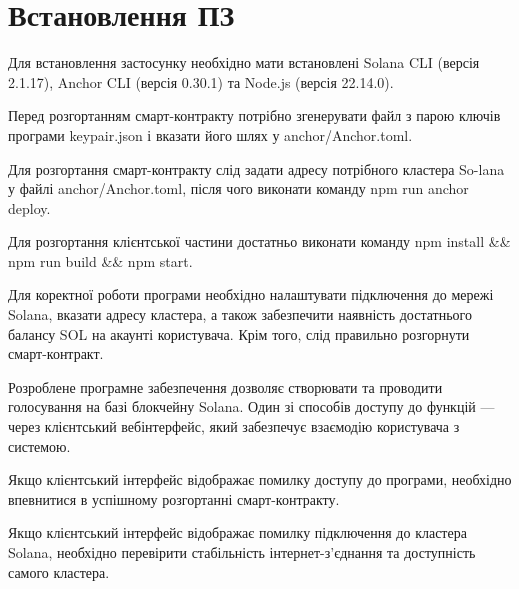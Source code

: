\documentclass[14pt]{extreport}
\newcommand{\nocontentsline}[3]{}
\newcommand{\tocless}[2]{\bgroup\let\addcontentsline=\nocontentsline#1{#2}\egroup}
\begin{document}
  \tocless\section{Встановлення ПЗ}
  
  Для встановлення застосунку необхідно мати встановлені Solana CLI (версія 2.1.17), Anchor CLI (версія 0.30.1) та Node.js (версія 22.14.0).  

  Перед розгортанням смарт-контракту потрібно згенерувати файл з парою ключів програми keypair.json і вказати його шлях у anchor/Anchor.toml.

  Для розгортання смарт-контракту слід задати адресу потрібного кластера So-lana у файлі anchor/Anchor.toml, після чого виконати команду npm run anchor deploy.
  
  Для розгортання клієнтської частини достатньо виконати команду npm install \&\& npm run build \&\& npm start.
  
  \tocless\section{Налаштування ПЗ}
  
  Для коректної роботи програми необхідно налаштувати підключення до мережі Solana, вказати адресу кластера, а також забезпечити наявність достатнього балансу SOL на акаунті користувача. Крім того, слід правильно розгорнути смарт-контракт.
  
  \tocless\section{Базові функції ПЗ}
  
  Розроблене програмне забезпечення дозволяє створювати та проводити голосування на базі блокчейну Solana. Один зі способів доступу до функцій — через клієнтський вебінтерфейс, який забезпечує взаємодію користувача з системою.
  
  \tocless\section{Аналіз помилок}
  
  Якщо клієнтський інтерфейс відображає помилку доступу до програми, необхідно впевнитися в успішному розгортанні смарт-контракту.
  
  Якщо клієнтський інтерфейс відображає помилку підключення до кластера Solana, необхідно перевірити стабільність інтернет-з’єднання та доступність самого кластера.
  
\end{document}

